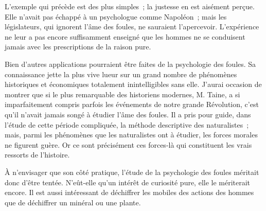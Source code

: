 \documentclass[french,twoside]{book} %
\begin{document}
L’exemple qui précède est des plus simples ; la justesse en est aisément perçue. Elle n’avait pas échappé à un psychologue comme Napoléon ; mais les législateurs, qui ignorent l’âme des foules, ne sauraient l’apercevoir. L’expérience ne leur a pas encore suffisamment enseigné que les hommes ne se conduisent jamais avec les pres­criptions de la raison pure.\par
Bien d’autres applications pourraient être faites de la psychologie des foules. Sa connaissance jette la plus vive lueur sur un grand nombre de phénomènes historiques et économiques totalement inintelligibles sans elle. J’aurai occasion de montrer que si le plus remarquable des historiens modernes, M. Taine, a si imparfaitement compris parfois les événements de notre grande Révolution, c’est qu’il n’avait jamais songé à étudier l’âme des foules. Il a pris pour guide, dans l’étude de cette période compliquée, la méthode descriptive des naturalistes ; mais, parmi les phénomènes que les natura­listes ont à étudier, les forces morales ne figurent guère. Or ce sont précisément ces forces-là qui constituent les vrais ressorts de l’histoire.\par
À n’envisager que son côté pratique, l’étude de la psychologie des foules méritait donc d’être tentée. N’eût-elle qu’un intérêt de curiosité pure, elle le mériterait encore. Il est aussi intéressant de déchiffrer les mobiles des actions des hommes que de déchiffrer un minéral ou une plante.\par
\end{document}
